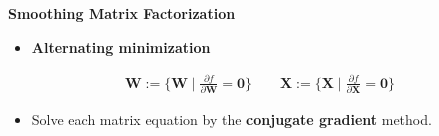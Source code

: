\documentclass{beamer}
\begin{document}
\begin{frame}{\color{black}\textbf{Smoothing Matrix Factorization}}
\begin{itemize}
\item \textbf{Alternating minimization}
\end{itemize}

\begin{equation*}
\begin{aligned}
\boldsymbol{W}:=\{\boldsymbol{W}\mid\frac{\partial f}{\partial\boldsymbol{W}}=\boldsymbol{0}\}\quad\quad
\boldsymbol{X}:=\{\boldsymbol{X}\mid\frac{\partial f}{\partial\boldsymbol{X}}=\boldsymbol{0}\}
\end{aligned}
\end{equation*}

\begin{itemize}
\item Solve each matrix equation by the \textbf{conjugate gradient} method.
\end{itemize}

\end{frame}
\end{document}
